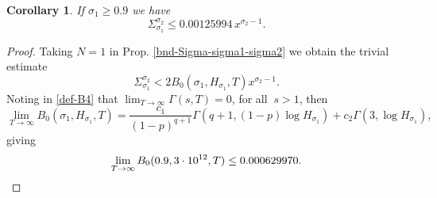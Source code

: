 \documentclass[10pt]{amsart}
\newcommand{\s}{\sigma}
\newtheorem{cor}[prop]{Corollary}
\theoremstyle{definition}
\numberwithin{equation}{section}
\begin{document}
\begin{cor}\label{cor:simpleboundSig12}
If $\sigma_1 \geq 0.9$ we have
\[  \Sigma_{\sigma_1}^{\sigma_2} \le    0.00125994\,x^{\sigma_2 - 1}.
 \]                                                              
\end{cor}
\begin{proof}
Taking $N=1$ in Prop. \ref{bnd-Sigma-sigma1-sigma2} we obtain the trivial estimate
\[ \Sigma_{\sigma_1}^{\sigma_2} < 2B_0( \s_1, H_{\s_1}, T)x^{\s_2-1}. \]
Noting in \eqref{def-B4} that $\lim_{T\to\infty}\Gamma(s,T) =0$, for all $\ s>1$, then 
\begin{equation} 
\lim_{T\to \infty}  B_0( \s_1, H_{\s_1}, T) = 
\frac{c_1}{(1-p)^{q+1} }  \Gamma(q+1,(1-p)\log H_{\s_1}) 
+ c_2  \Gamma(3, \log H_{\s_1}),
 \end{equation} 
giving 
\[ \lim_{T\to \infty} B_0( 0.9, 3\cdot 10^{12}, T) \le  
0.000629970 .\qedhere\]
\end{proof}
%
\end{document}
